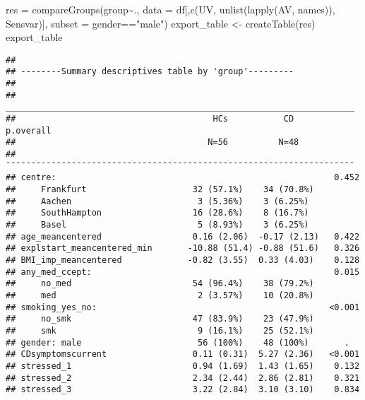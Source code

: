 \documentclass[
]{article}
\newenvironment{Shaded}{\begin{snugshade}}{\end{snugshade}}
\newcommand{\AttributeTok}[1]{\textcolor[rgb]{0.77,0.63,0.00}{#1}}
\newcommand{\FunctionTok}[1]{\textcolor[rgb]{0.00,0.00,0.00}{#1}}
\newcommand{\NormalTok}[1]{#1}
\newcommand{\OtherTok}[1]{\textcolor[rgb]{0.56,0.35,0.01}{#1}}
\newcommand{\SpecialCharTok}[1]{\textcolor[rgb]{0.00,0.00,0.00}{#1}}
\newcommand{\StringTok}[1]{\textcolor[rgb]{0.31,0.60,0.02}{#1}}
\begin{document}
\begin{Shaded}
\begin{Highlighting}[]
\NormalTok{res }\OtherTok{=} \FunctionTok{compareGroups}\NormalTok{(group}\SpecialCharTok{\textasciitilde{}}\NormalTok{., }\AttributeTok{data =}\NormalTok{ df[,}\FunctionTok{c}\NormalTok{(UV, }\FunctionTok{unlist}\NormalTok{(}\FunctionTok{lapply}\NormalTok{(AV, names)), Sensvar)], }
                    \AttributeTok{subset =}\NormalTok{ gender}\SpecialCharTok{==}\StringTok{"male"}\NormalTok{)}
\NormalTok{export\_table }\OtherTok{\textless{}{-}} \FunctionTok{createTable}\NormalTok{(res)}
\NormalTok{export\_table}
\end{Highlighting}
\end{Shaded}

\begin{verbatim}
## 
## --------Summary descriptives table by 'group'---------
## 
## _____________________________________________________________________ 
##                                       HCs           CD      p.overall 
##                                      N=56          N=48               
## ¯¯¯¯¯¯¯¯¯¯¯¯¯¯¯¯¯¯¯¯¯¯¯¯¯¯¯¯¯¯¯¯¯¯¯¯¯¯¯¯¯¯¯¯¯¯¯¯¯¯¯¯¯¯¯¯¯¯¯¯¯¯¯¯¯¯¯¯¯ 
## centre:                                                       0.452   
##     Frankfurt                     32 (57.1%)    34 (70.8%)            
##     Aachen                         3 (5.36%)    3 (6.25%)             
##     SouthHampton                  16 (28.6%)    8 (16.7%)             
##     Basel                          5 (8.93%)    3 (6.25%)             
## age_meancentered                  0.16 (2.06)  -0.17 (2.13)   0.422   
## explstart_meancentered_min       -10.88 (51.4) -0.88 (51.6)   0.326   
## BMI_imp_meancentered             -0.82 (3.55)  0.33 (4.03)    0.128   
## any_med_ccept:                                                0.015   
##     no_med                        54 (96.4%)    38 (79.2%)            
##     med                            2 (3.57%)    10 (20.8%)            
## smoking_yes_no:                                              <0.001   
##     no_smk                        47 (83.9%)    23 (47.9%)            
##     smk                            9 (16.1%)    25 (52.1%)            
## gender: male                       56 (100%)    48 (100%)       .     
## CDsymptomscurrent                 0.11 (0.31)  5.27 (2.36)   <0.001   
## stressed_1                        0.94 (1.69)  1.43 (1.65)    0.132   
## stressed_2                        2.34 (2.44)  2.86 (2.81)    0.321   
## stressed_3                        3.22 (2.84)  3.10 (3.10)    0.834   

\end{verbatim}
\end{document}
